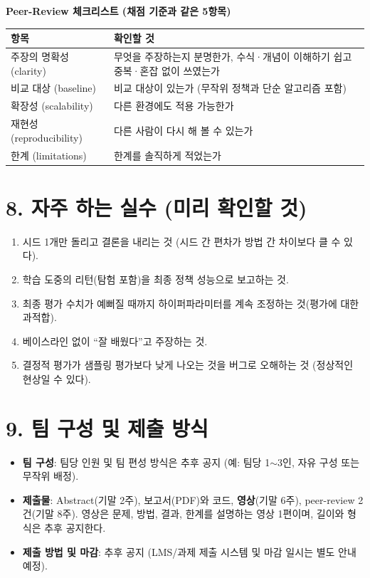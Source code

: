 \documentclass[12pt]{article}
\begin{document}
\vspace{4pt}
\noindent\textbf{Peer-Review 체크리스트 (채점 기준과 같은 5항목)}
\begin{center}
\small
\begin{tabular}{@{}ll@{}}
\toprule
항목 & 확인할 것 \\
\midrule
주장의 명확성 (clarity) & 무엇을 주장하는지 분명한가, 수식·개념이 이해하기 쉽고 중복·혼잡 없이 쓰였는가 \\
비교 대상 (baseline) & 비교 대상이 있는가 (무작위 정책과 단순 알고리즘 포함) \\
확장성 (scalability) & 다른 환경에도 적용 가능한가 \\
재현성 (reproducibility) & 다른 사람이 다시 해 볼 수 있는가 \\
한계 (limitations) & 한계를 솔직하게 적었는가 \\
\bottomrule
\end{tabular}
\end{center}

\section*{8. 자주 하는 실수 (미리 확인할 것)}
\begin{enumerate}
\item 시드 1개만 돌리고 결론을 내리는 것 (시드 간 편차가 방법 간
  차이보다 클 수 있다).
\item 학습 도중의 리턴(탐험 포함)을 최종 정책 성능으로 보고하는 것.
\item 최종 평가 수치가 예뻐질 때까지 하이퍼파라미터를 계속 조정하는
  것(평가에 대한 과적합).
\item 베이스라인 없이 ``잘 배웠다''고 주장하는 것.
\item 결정적 평가가 샘플링 평가보다 낮게 나오는 것을 버그로 오해하는
  것 (정상적인 현상일 수 있다).
\end{enumerate}

\section*{9. 팀 구성 및 제출 방식}
\begin{itemize}
\item \textbf{팀 구성}: 팀당 인원 및 팀 편성 방식은 추후 공지 (예:
  팀당 1$\sim$3인, 자유 구성 또는 무작위 배정).
\item \textbf{제출물}: Abstract(기말 2주), 보고서(PDF)와 코드, \textbf{영상}(기말 6주), peer-review 2건(기말 8주). 영상은 문제, 방법, 결과, 한계를 설명하는 영상 1편이며, 길이와 형식은 추후 공지한다.
\item \textbf{제출 방법 및 마감}: 추후 공지 (LMS/과제 제출 시스템 및
  마감 일시는 별도 안내 예정).
\end{itemize}
\end{document}
